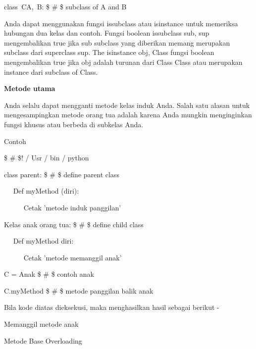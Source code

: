 \begin{12pt}
\begin{12pt}
\begin{12pt}
\begin{12pt}
\begin{12pt}
\begin{12pt}
\begin{12pt}
\begin{12pt}
\begin{12pt}
\begin{12pt}
\begin{12pt}
\begin{12pt}
\begin{12pt}
\begin{12pt}
\begin{12pt}
\begin{12pt}
\begin{12pt}
\begin{12pt}
\begin{12pt}
\begin{12pt}
\begin{12pt}
\begin{12pt}
\noindent 
class~C{A,~B}:    \$  \#  \$ subclass of A and B \par
\begin{12pt}
Anda dapat menggunakan fungsi issubclass {} atau isinstance {} untuk memeriksa hubungan dua kelas dan contoh. Fungsi boolean issubclass {sub, sup} mengembalikan true jika sub subclass yang diberikan memang merupakan subclass dari superclass sup. The isinstance {obj, Class} fungsi boolean mengembalikan true jika obj adalah turunan dari Class Class atau merupakan instance dari subclass of Class. \par
\vspace{12pt}
\noindent 
{\fontsize{14pt}{14pt}\selectfont \textbf{Metode utama} \\} \par
\vspace{12pt}
Anda selalu dapat mengganti metode kelas induk Anda. Salah satu alasan untuk mengesampingkan metode orang tua adalah karena Anda mungkin menginginkan fungsi khusus atau berbeda di subkelas Anda. \par
Contoh \par
\vspace{12pt}
\noindent 
 \$  \#  \$! / Usr / bin / python \par
\vspace{12pt}
\noindent 
class parent:  \$  \#  \$ define parent class \par
\noindent 
~~ Def myMethod (diri): \par
\noindent 
~~~~~ Cetak 'metode induk panggilan' \par
\vspace{12pt}
\noindent 
Kelas anak {orang tua}:  \$  \#  \$ define child class \par
\noindent 
~~ Def myMethod {diri}: \par
\noindent 
~~~~~ Cetak 'metode memanggil anak' \par
\vspace{12pt}
\noindent 
C = Anak {}\$  \#  \$ contoh anak \par
\noindent 
C.myMethod {}  \$  \#  \$ metode panggilan balik anak \par
\vspace{12pt}
\noindent 
Bila kode diatas dieksekusi, maka menghasilkan hasil sebagai berikut - \par
\vspace{12pt}
\noindent 
Memanggil metode anak \par
\vspace{12pt}
\noindent 
Metode Base Overloading \par

\end{12pt}
\end{12pt}
\end{12pt}
\end{12pt}
\end{12pt}
\end{12pt}
\end{12pt}
\end{12pt}
\end{12pt}
\end{12pt}
\end{12pt}
\end{12pt}
\end{12pt}
\end{12pt}
\end{12pt}
\end{12pt}
\end{12pt}
\end{12pt}
\end{12pt}
\end{12pt}
\end{12pt}
\end{12pt}
\end{12pt}

